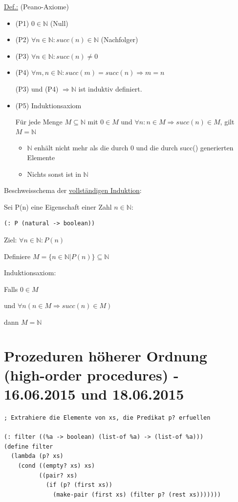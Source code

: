 \documentclass[a4paper, 20pt, openany]{book}
\begin{document}
\underline{Def.:} (Peano-Axiome)

\begin{itemize}
  \item (P1) $0 \in \mathbb{N}$ (Null)
  \item (P2) $\forall n \in \mathbb{N} : succ(n) \in \mathbb{N}$ (Nachfolger)
  \item (P3) $\forall n \in \mathbb{N} : succ(n) \neq 0$ 
  \item (P4) $\forall m,n \in \mathbb{N} : succ(m) = succ(n) \Rightarrow m=n$
  
  (P3) und (P4) $\Rightarrow \mathbb{N}$ ist induktiv definiert.
  
  \item (P5) Induktionsaxiom
  
  Für jede Menge $M \subseteq \mathbb{N}$ mit $0 \in M$ und $\forall n: n \in M \Rightarrow succ(n) \in M$, gilt $M = \mathbb{N}$
  
  \begin{itemize}
    \item $\mathbb{N}$ enhält nicht mehr als die durch 0 und die durch succ() generierten Elemente
    \item Nichts sonst ist in $\mathbb{N}$
  \end{itemize}
\end{itemize}

Beschweisschema der \underline{vollständigen Induktion}: 

Sei P(n) eine Eigenschaft einer Zahl $n \in \mathbb{N}$: 

\begin{lstlisting}
(: P (natural -> boolean))
\end{lstlisting}

Ziel: $\forall n \in \mathbb{N} : P(n)$

Definiere $M = \{n \in \mathbb{N} | P(n) \} \subseteq \mathbb{N}$

Induktionsaxiom:

Falls $0 \in M$

und $\forall n (n \in M \Rightarrow succ(n) \in M)$

dann $M = \mathbb{N}$

\chapter{Prozeduren höherer Ordnung (high-order procedures) - 16.06.2015 und 18.06.2015}

\begin{lstlisting}
; Extrahiere die Elemente von xs, die Predikat p? erfuellen

(: filter ((%a -> boolean) (list-of %a) -> (list-of %a)))
(define filter
  (lambda (p? xs)
    (cond ((empty? xs) xs)
          ((pair? xs) 
            (if (p? (first xs))
              (make-pair (first xs) (filter p? (rest xs)))))))
\end{lstlisting}
\end{document}
